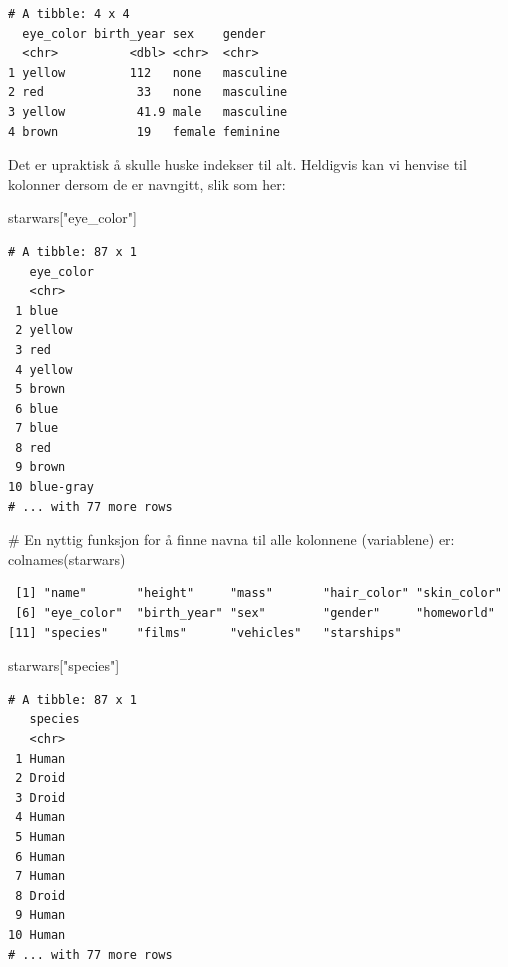 \documentclass[
  letterpaper,
  DIV=11,
  numbers=noendperiod]{scrreprt}
\newenvironment{Shaded}{\begin{snugshade}}{\end{snugshade}}
\newcommand{\CommentTok}[1]{\textcolor[rgb]{0.37,0.37,0.37}{#1}}
\newcommand{\FunctionTok}[1]{\textcolor[rgb]{0.28,0.35,0.67}{#1}}
\newcommand{\NormalTok}[1]{\textcolor[rgb]{0.00,0.23,0.31}{#1}}
\newcommand{\StringTok}[1]{\textcolor[rgb]{0.13,0.47,0.30}{#1}}
\begin{document}
\begin{verbatim}
# A tibble: 4 x 4
  eye_color birth_year sex    gender   
  <chr>          <dbl> <chr>  <chr>    
1 yellow         112   none   masculine
2 red             33   none   masculine
3 yellow          41.9 male   masculine
4 brown           19   female feminine 
\end{verbatim}

Det er upraktisk å skulle huske indekser til alt. Heldigvis kan vi
henvise til kolonner dersom de er navngitt, slik som her:

\begin{Shaded}
\begin{Highlighting}[]
\NormalTok{starwars[}\StringTok{"eye\_color"}\NormalTok{]}
\end{Highlighting}
\end{Shaded}

\begin{verbatim}
# A tibble: 87 x 1
   eye_color
   <chr>    
 1 blue     
 2 yellow   
 3 red      
 4 yellow   
 5 brown    
 6 blue     
 7 blue     
 8 red      
 9 brown    
10 blue-gray
# ... with 77 more rows
\end{verbatim}

\begin{Shaded}
\begin{Highlighting}[]
\CommentTok{\# En nyttig funksjon for å finne navna til alle kolonnene (variablene) er:}
\FunctionTok{colnames}\NormalTok{(starwars)}
\end{Highlighting}
\end{Shaded}

\begin{verbatim}
 [1] "name"       "height"     "mass"       "hair_color" "skin_color"
 [6] "eye_color"  "birth_year" "sex"        "gender"     "homeworld" 
[11] "species"    "films"      "vehicles"   "starships" 
\end{verbatim}

\begin{Shaded}
\begin{Highlighting}[]
\NormalTok{starwars[}\StringTok{"species"}\NormalTok{]}
\end{Highlighting}
\end{Shaded}

\begin{verbatim}
# A tibble: 87 x 1
   species
   <chr>  
 1 Human  
 2 Droid  
 3 Droid  
 4 Human  
 5 Human  
 6 Human  
 7 Human  
 8 Droid  
 9 Human  
10 Human  
# ... with 77 more rows
\end{verbatim}
\end{document}
